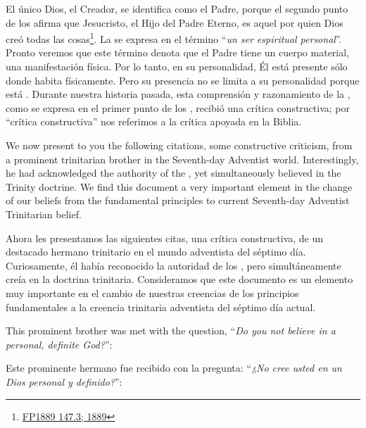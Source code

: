 El único Dios, el Creador, se identifica como el Padre, porque el segundo punto de los  afirma que Jesucristo, el Hijo del Padre Eterno, es aquel por quien Dios creó todas las cosas\footnote{\href{https://egwwritings.org/?ref=en_FP1889.147.3&para=931.7}{FP1889 147.3; 1889}}. La  se expresa en el término “\textit{un ser espiritual personal}”. Pronto veremos que este término denota que el Padre tiene un cuerpo material, una manifestación física. Por lo tanto, en su personalidad, Él está presente sólo donde habita físicamente. Pero su presencia no se limita a su personalidad porque está . Durante nuestra historia pasada, esta comprensión y razonamiento de la , como se expresa en el primer punto de los , recibió una crítica constructiva; por “crítica constructiva” nos referimos a la crítica apoyada en la Biblia.


We now present to you the following citations, some constructive criticism, from a prominent trinitarian brother in the Seventh-day Adventist world. Interestingly, he had acknowledged the authority of the , yet simultaneously believed in the Trinity doctrine. We find this document a very important element in the change of our beliefs from the fundamental principles to current Seventh-day Adventist Trinitarian belief.


Ahora les presentamos las siguientes citas, una crítica constructiva, de un destacado hermano trinitario en el mundo adventista del séptimo día. Curiosamente, él había reconocido la autoridad de los , pero simultáneamente creía en la doctrina trinitaria. Consideramos que este documento es un elemento muy importante en el cambio de nuestras creencias de los principios fundamentales a la creencia trinitaria adventista del séptimo día actual.


This prominent brother was met with the question, “\textit{Do you not believe in a personal, definite God?}”:


Este prominente hermano fue recibido con la pregunta: “\textit{¿No cree usted en un Dios personal y definido?}”:





